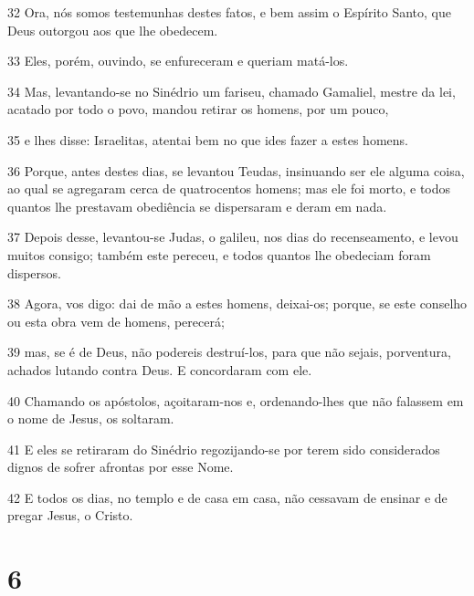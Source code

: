 \par 32 Ora, nós somos testemunhas destes fatos, e bem assim o Espírito Santo, que Deus outorgou aos que lhe obedecem.
\par 33 Eles, porém, ouvindo, se enfureceram e queriam matá-los.
\par 34 Mas, levantando-se no Sinédrio um fariseu, chamado Gamaliel, mestre da lei, acatado por todo o povo, mandou retirar os homens, por um pouco,
\par 35 e lhes disse: Israelitas, atentai bem no que ides fazer a estes homens.
\par 36 Porque, antes destes dias, se levantou Teudas, insinuando ser ele alguma coisa, ao qual se agregaram cerca de quatrocentos homens; mas ele foi morto, e todos quantos lhe prestavam obediência se dispersaram e deram em nada.
\par 37 Depois desse, levantou-se Judas, o galileu, nos dias do recenseamento, e levou muitos consigo; também este pereceu, e todos quantos lhe obedeciam foram dispersos.
\par 38 Agora, vos digo: dai de mão a estes homens, deixai-os; porque, se este conselho ou esta obra vem de homens, perecerá;
\par 39 mas, se é de Deus, não podereis destruí-los, para que não sejais, porventura, achados lutando contra Deus. E concordaram com ele.
\par 40 Chamando os apóstolos, açoitaram-nos e, ordenando-lhes que não falassem em o nome de Jesus, os soltaram.
\par 41 E eles se retiraram do Sinédrio regozijando-se por terem sido considerados dignos de sofrer afrontas por esse Nome.
\par 42 E todos os dias, no templo e de casa em casa, não cessavam de ensinar e de pregar Jesus, o Cristo.

\chapter{6}

